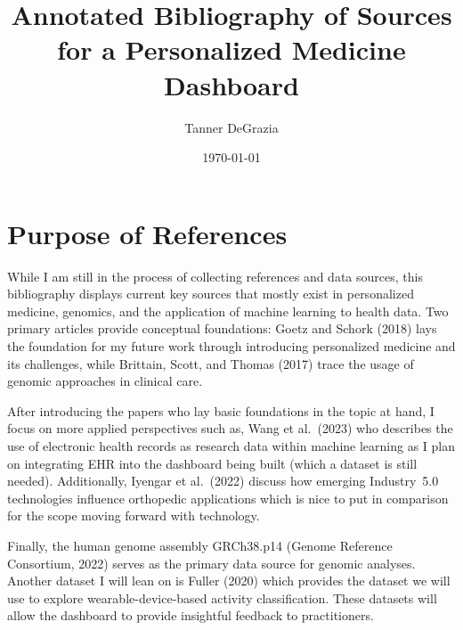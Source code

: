 \documentclass[12pt]{article}
\title{Annotated Bibliography of Sources for a Personalized Medicine Dashboard}
\author{Tanner DeGrazia}
\date{\today}
\begin{document}
\maketitle

\section*{Purpose of References}

While I am still in the process of collecting references and data sources, this bibliography displays current key sources that mostly exist in personalized medicine, genomics, and the application of machine learning to health data. Two primary articles provide conceptual foundations: Goetz and Schork (2018) \cite{goetz2018} lays the foundation for my future work through introducing personalized medicine and its challenges, while Brittain, Scott, and Thomas (2017) \cite{brittain2017} trace the usage of genomic approaches in clinical care.  

After introducing the papers who lay basic foundations in the topic at hand, I focus on more applied perspectives such as, Wang et al.\ (2023) \cite{wang2023} who describes the use of electronic health records as research data within machine learning as I plan on integrating EHR into the dashboard being built (which a dataset is still needed). Additionally, Iyengar et al.\ (2022) \cite{iyengar2022} discuss how emerging Industry~5.0 technologies influence orthopedic applications which is nice to put in comparison for the scope moving forward with technology.  

Finally, the human genome assembly GRCh38.p14 (Genome Reference Consortium, 2022) \cite{ncbi2022} serves as the primary data source for genomic analyses. Another dataset I will lean on is Fuller (2020) \cite{fuller2020} which provides the dataset we will use to explore wearable-device-based activity classification. These datasets will allow the dashboard to provide insightful feedback to practitioners.  

\printbibliography[title={References}]
\end{document}
